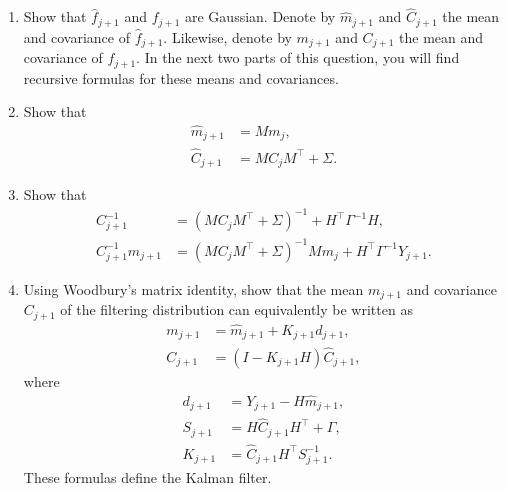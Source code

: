 \begin{enumerate}
\begin{enumerate}[label=\alph*)]
  \item Show that $\widehat{f}_{j+1}$ and $f_{j+1}$ are Gaussian. Denote by
    $\widehat{m}_{j+1}$ and $\widehat{C}_{j+1}$ the mean and covariance of
    $\widehat{f}_{j+1}$. Likewise, denote by $m_{j+1}$ and $C_{j+1}$ the mean and
    covariance of $f_{j+1}$. In the next two parts of this question, you will find
    recursive formulas for these means and covariances.

  \item Show that
    \begin{align*}
      \widehat{m}_{j+1} &= Mm_j, \\
      \widehat{C}_{j+1} &= MC_j M^\top + \Sigma.
    \end{align*}

  \item Show that
    \begin{align*}
      C_{j+1}^{-1} &= \left(MC_j M^\top + \Sigma\right)^{-1} + H^\top \Gamma^{-1} H, \\
      C_{j+1}^{-1} m_{j+1}
        &= \left(MC_j M^\top + \Sigma\right)^{-1} Mm_j + H^\top \Gamma^{-1} Y_{j+1}.
    \end{align*}

  \item Using Woodbury's matrix identity, show that the mean $m_{j+1}$ and covariance
    $C_{j+1}$ of the filtering distribution can equivalently be written as
    \begin{align*}
      m_{j+1} &= \widehat{m}_{j+1} + K_{j+1} d_{j+1}, \\
      C_{j+1} &= (I - K_{j+1} H)\widehat{C}_{j+1},
    \end{align*}
    where
    \begin{align*}
      d_{j+1} &= Y_{j+1} - H\widehat{m}_{j+1}, \\
      S_{j+1} &= H\widehat{C}_{j+1} H^\top + \Gamma, \\
      K_{j+1} &= \widehat{C}_{j+1} H^\top S_{j+1}^{-1}.
    \end{align*}
    These formulas define the Kalman filter.
\end{enumerate}


\end{enumerate}
